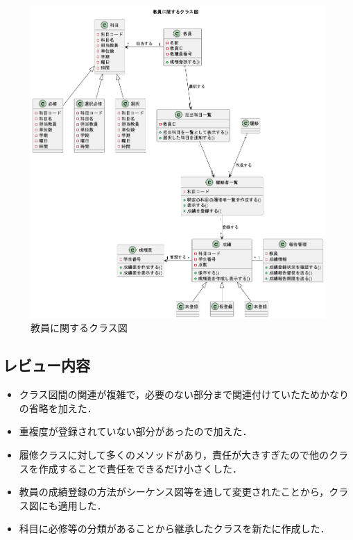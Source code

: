 \documentclass[documentclass]{jsarticle}
\begin{document}
\begin{figure}[H]
  \begin{center}
    \includegraphics*[scale=0.4]{figure/5-4.png}
  \end{center}
  \caption{教員に関するクラス図}
  \label{fig:5-4}
\end{figure}

\subsection*{レビュー内容}
\begin{itemize}
  \item クラス図間の関連が複雑で，必要のない部分まで関連付けていたためかなりの省略を加えた．
  \item 重複度が登録されていない部分があったので加えた．
  \item 履修クラスに対して多くのメソッドがあり，責任が大きすぎたので他のクラスを作成することで責任をできるだけ小さくした．
  \item 教員の成績登録の方法がシーケンス図等を通して変更されたことから，クラス図にも適用した．
  \item 科目に必修等の分類があることから継承したクラスを新たに作成した．
\end{itemize}
\end{document}

